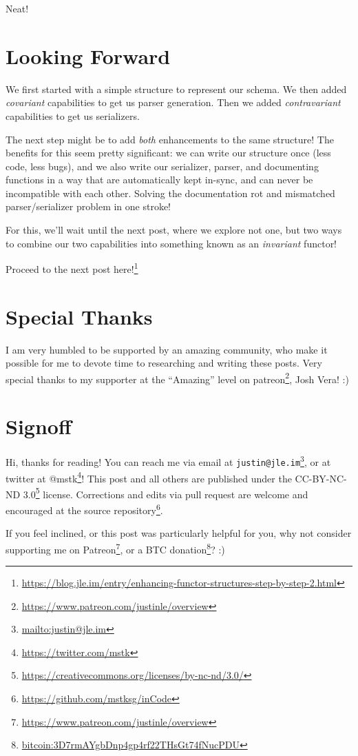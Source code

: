 \documentclass[]{article}
\renewcommand{\href}[2]{#2\footnote{\url{#1}}}
\begin{document}
Neat!

\hypertarget{looking-forward}{%
\section{Looking Forward}\label{looking-forward}}

We first started with a simple structure to represent our schema. We then added
\emph{covariant} capabilities to get us parser generation. Then we added
\emph{contravariant} capabilities to get us serializers.

The next step might be to add \emph{both} enhancements to the same structure!
The benefits for this seem pretty significant: we can write our structure once
(less code, less bugs), and we also write our serializer, parser, and
documenting functions in a way that are automatically kept in-sync, and can
never be incompatible with each other. Solving the documentation rot and
mismatched parser/serializer problem in one stroke!

For this, we'll wait until the next post, where we explore not one, but two ways
to combine our two capabilities into something known as an \emph{invariant}
functor!

\href{https://blog.jle.im/entry/enhancing-functor-structures-step-by-step-2.html}{Proceed
to the next post here!}

\hypertarget{special-thanks}{%
\section{Special Thanks}\label{special-thanks}}

I am very humbled to be supported by an amazing community, who make it possible
for me to devote time to researching and writing these posts. Very special
thanks to my supporter at the ``Amazing'' level on
\href{https://www.patreon.com/justinle/overview}{patreon}, Josh Vera! :)

\hypertarget{signoff}{%
\section{Signoff}\label{signoff}}

Hi, thanks for reading! You can reach me via email at
\href{mailto:justin@jle.im}{\nolinkurl{justin@jle.im}}, or at twitter at
\href{https://twitter.com/mstk}{@mstk}! This post and all others are published
under the \href{https://creativecommons.org/licenses/by-nc-nd/3.0/}{CC-BY-NC-ND
3.0} license. Corrections and edits via pull request are welcome and encouraged
at \href{https://github.com/mstksg/inCode}{the source repository}.

If you feel inclined, or this post was particularly helpful for you, why not
consider \href{https://www.patreon.com/justinle/overview}{supporting me on
Patreon}, or a \href{bitcoin:3D7rmAYgbDnp4gp4rf22THsGt74fNucPDU}{BTC donation}?
:)
\end{document}

